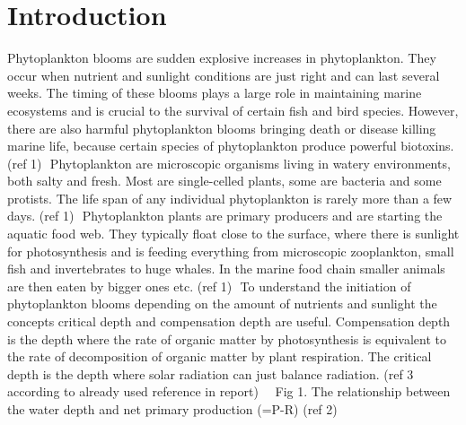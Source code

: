 \documentclass[../Main.tex]{subfiles}
\begin{document}
\section*{\crule[blue]{.3cm}{.3cm} Introduction}
Phytoplankton blooms are sudden explosive increases in phytoplankton. They occur when nutrient and sunlight conditions are just right and can last several weeks. The timing of these blooms plays a large role in maintaining marine ecosystems and is crucial to the survival of certain fish and bird species. However, there are also harmful phytoplankton blooms bringing death or disease killing marine life, because certain species of phytoplankton produce powerful biotoxins. (ref 1) 
Phytoplankton are microscopic organisms living in watery environments, both salty and fresh. Most are single-celled plants, some are bacteria and some protists. The life span of any individual phytoplankton is rarely more than a few days. (ref 1)  Phytoplankton plants are primary producers and are starting the aquatic food web. They typically float close to the surface, where there is sunlight for photosynthesis and is feeding everything from microscopic zooplankton, small fish and invertebrates to huge whales. In the marine food chain smaller animals are then eaten by bigger ones etc. (ref 1)  To understand the initiation of phytoplankton blooms depending on the amount of nutrients and sunlight the concepts critical depth and compensation depth are useful. Compensation depth is the depth where the rate of organic matter by photosynthesis is equivalent to the rate of decomposition of organic matter by plant respiration. The critical depth is the depth where solar radiation can just balance radiation. (ref 3 according to already used reference in report)    Fig 1. The relationship between the water depth and net primary production (=P-R) (ref 2)
\end{document}
